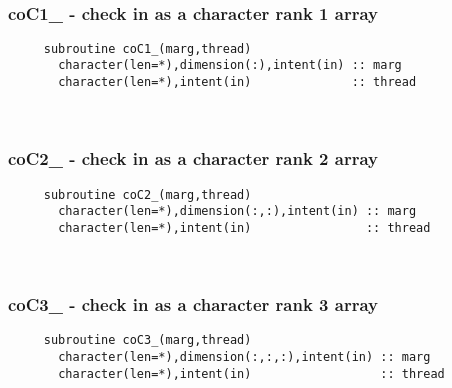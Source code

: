  
\mbox{}\hrulefill\ 
 
  \subsubsection{coC1\_ - check in as a character rank 1 array}

\begin{verbatim} 
     subroutine coC1_(marg,thread)
       character(len=*),dimension(:),intent(in) :: marg
       character(len=*),intent(in)              :: thread
 \end{verbatim}%
 
 
\mbox{}\hrulefill\ 

  \subsubsection{coC2\_ - check in as a character rank 2 array}

\begin{verbatim} 
     subroutine coC2_(marg,thread)
       character(len=*),dimension(:,:),intent(in) :: marg
       character(len=*),intent(in)                :: thread
 \end{verbatim}%
 
 
\mbox{}\hrulefill\ 

  \subsubsection{coC3\_ - check in as a character rank 3 array}

\begin{verbatim} 
     subroutine coC3_(marg,thread)
       character(len=*),dimension(:,:,:),intent(in) :: marg
       character(len=*),intent(in)                  :: thread
 \end{verbatim}%
 
